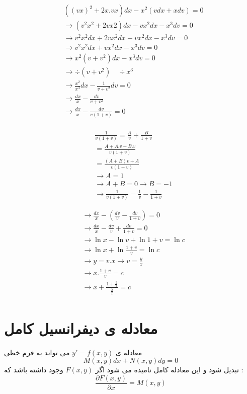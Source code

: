 \documentclass[12pt]{book}
\begin{document}
\begin{align*}
&( (vx)^{2} + 2x.vx ) dx - x^{2} ( vdx + xdv ) = 0 \\
&\to (v^{2}x^{2} + 2vx{2})dx - vx^{2}dx - x^{3}dv = 0 \\
&\to v^{2}x^{2} dx + 2vx^{2}dx - vx^{2}dx - x^{3}dv = 0 \\
&\to v^{2}x^{2}dx + vx^{2}dx - x^{3}dv = 0 \\
&\to x^{2} ( v + v^{2} ) dx - x^{3} dv = 0 \\
&\to \div (v + v^{2}) \quad \div x^{3} \\
&\to \frac{x^{2}}{x^{3}}dx - \frac{1}{v + v^{2}}dv = 0 \\
&\to \frac{dx}{x} - \frac{dv}{v + v^{2}} \\
&\to \frac{dx}{x} - \frac{dv}{v(1+v)} = 0 \\
\end{align*}

\begin{align*}
& \frac{1}{v(1+v)} = \frac{A}{v} + \frac{B}{1+v} \\
&= \frac{A + A.v + B.v}{v(1+v)} \\
&= \frac{(A+B)v + A}{v(1+v)} \\
&\to A = 1 \\
&\to A + B = 0 \to B = -1 \\
&\to \frac{1}{v(1+v)} = \frac{1}{v} - \frac{1}{1+v}
\end{align*}


\begin{align*}
&\to \frac{dx}{x} - \left( \frac{dv}{v} - \frac{dv}{1+v} \right) = 0  \\
&\to \frac{dx}{x} -  \frac{dv}{v} + \frac{dv}{1+v} = 0  \\
&\to \ln{x} - \ln{v} + \ln{1+v} = \ln{c} \\
&\to \ln{x} + \ln{\frac{1+v}{v}} = \ln{c} \\
&\to y = v.x \to v = \frac{y}{x} \\
&\to x . \frac{1+v}{v} = c \\
&\to x + \frac{1 + \frac{y}{x}}{\frac{y}{x}} = c \\
\end{align*}


\section{معادله ی دیفرانسیل کامل}

معادله ی 
$y' = f(x,y)$
می تواند به فرم خطی 
$$
M(x,y)dx + N(x,y)dy = 0 
$$
تبدیل شود و این معادله کامل نامیده می شود اگر
$F(x,y)$
وجود داشته باشد که :
$$
\frac{\partial{F(x,y)}}{\partial{x}} = M(x,y)
$$ 
\end{document}
